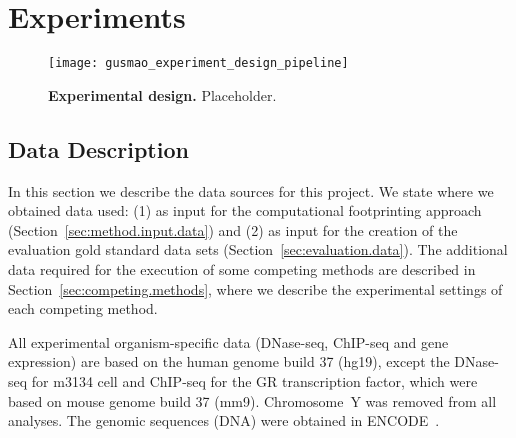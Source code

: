 \chapter{Experiments}
\label{cha:experiments}

\graphicspath{{chapter4/figs/}}


\begin{figure}[h!]
\centering
\texttt{[image: gusmao\_experiment\_design\_pipeline]}
\caption[Experimental design]{\textbf{Experimental design.} Placeholder.}
\label{fig:gusmao_experiment_design_pipeline}
\end{figure}


\section{Data Description}
\label{sec:data.description}

In this section we describe the data sources for this project. We state where we obtained data used: (1) as input for the computational footprinting approach (Section~\ref{sec:method.input.data}) and (2) as input for the creation of the evaluation gold standard data sets (Section~\ref{sec:evaluation.data}). The additional data required for the execution of some competing methods are described in Section~\ref{sec:competing.methods}, where we describe the experimental settings of each competing method.

All experimental organism-specific data (DNase-seq, ChIP-seq and gene expression) are based on the human genome build 37 (hg19), except the DNase-seq for m3134 cell and ChIP-seq for the GR transcription factor, which were based on mouse genome build 37 (mm9). Chromosome~Y was removed from all analyses. The genomic sequences (DNA) were obtained in ENCODE~\cite{encode2012}.

